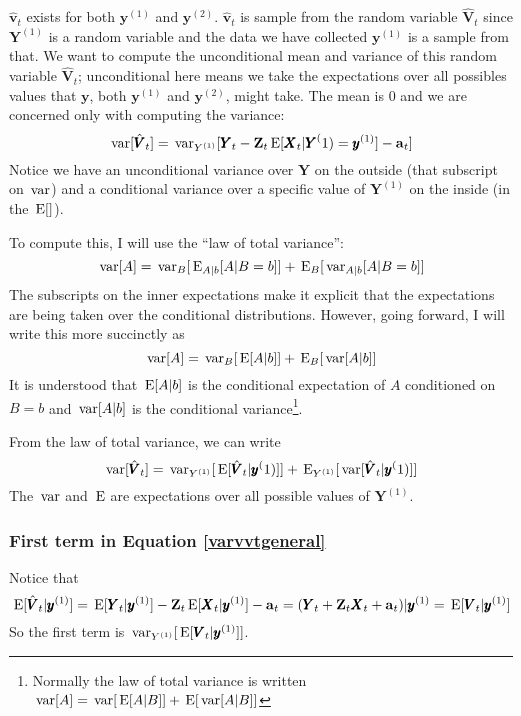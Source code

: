 \documentclass[]{article}
\def\XI{\mbox{\boldmath $\Xi$}}
\def\E{\,\textup{\textrm{E}}}
\def\VV{\mbox{$\pmb{V}$}}	\def\vv{\mbox{$\pmb{v}$}}
\def\XX{\mbox{$\pmb{X}$}}	\def\xx{\mbox{$\pmb{x}$}}
\def\YY{\mbox{$\pmb{Y}$}}	\def\yy{\mbox{$\pmb{y}$}}
\def\ZZ{\mbox{$\mathbf Z$}}	\def\zz{\mbox{$\mathbf z$}}	\def\Zb{\mbox{$\mathbf M$}} \def\Za{\mbox{$\mathbf N$}} \def\Zm{\XI}
\def\var{\,\textup{\textrm{var}}}
\begin{document}
$\hat{\vv}_t$ exists for both $\yy^{(1)}$ and $\yy^{(2)}$. $\hat{\vv}_t$ is sample from the random variable $\hat{\VV}_t$ since $\YY^{(1)}$ is a random variable and the data we have collected $\yy^{(1)}$ is a sample from that.  We want to compute the unconditional mean and variance of this random variable $\hat{\VV}_t$; unconditional here means we take the expectations over all possibles values that $\yy$, both $\yy^{(1)}$ and $\yy^{(2)}$, might take.  The mean is 0 and we are concerned only with computing the variance:
\begin{equation}\label{eq:var.vtT}
\var[\hat{\VV}_t] = \var_{Y^{(1)}}[\YY_t - \ZZ_t\E[\XX_t|\YY^(1)=\yy^{(1)}] - \aa_t]
\end{equation}
Notice we have an unconditional variance over $\YY$ on the outside (that subscript on $\var$) and a conditional variance over a specific value of $\YY^{(1)}$ on the inside (in the $\E[]$).

To compute this, I will use the ``law of total variance'':
\begin{equation}
\var[A] = \var_B[\E_{A|b}[A|B=b]] + \E_B[\var_{A|b}[A|B=b]]
\end{equation}
The subscripts on the inner expectations make it explicit that the expectations are being taken over the conditional distributions.  However, going forward, I will write this more succinctly as
\begin{equation}
\var[A] = \var_B[\E[A|b]] + \E_B[\var[A|b]]
\end{equation}
It is understood that $\E[A|b]$ is the conditional expectation of $A$ conditioned on $B=b$ and $\var[A|b]$ is the conditional variance\footnote{Normally the law of total variance is written $\var[A] = \var[\E[A|B]] + \E[\var[A|B]]$}.

From the law of total variance, we can write
\begin{equation}\label{varvvtgeneral}
\var[\hat{\VV}_t] = \var_{Y^{(1)}}[\E[\hat{\VV}_t|\yy^(1)]] + \E_{Y^{(1)}}[\var[\hat{\VV}_t|\yy^(1)]]
\end{equation}
The $\var$ and $\E$ are expectations over  all possible values of $\YY^(1)$.

\subsubsection{First term in Equation \ref{varvvtgeneral}}

Notice that 
\begin{equation}
\E[\hat{\VV}_t|\yy^{(1)}]=\E[\YY_t|\yy^{(1)}] - \ZZ_t\E[\XX_t|\yy^{(1)}] - \aa_t \\
=(\YY_t + \ZZ_t \XX_t + \aa_t)|\yy^{(1)} = \E[\VV_t|\yy^{(1)}] 
\end{equation}
So the first term is $\var_{Y^{(1)}}[\E[\VV_t|\yy^{(1)}]]$.  
\end{document}
